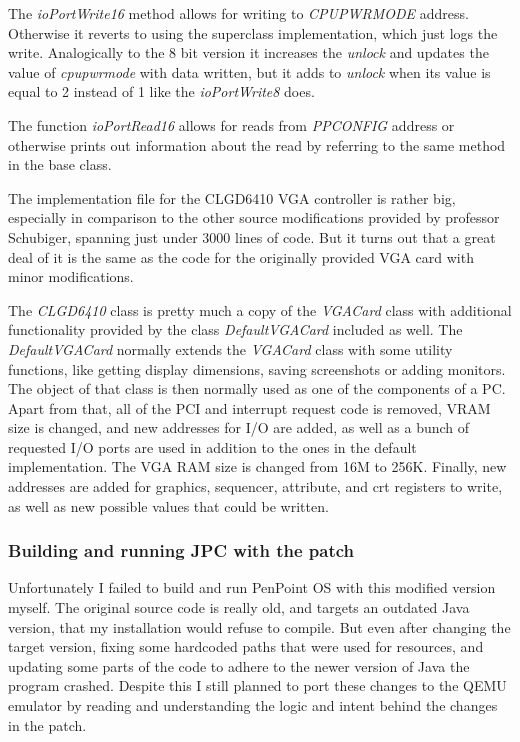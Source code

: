 The \emph{ioPortWrite16} method allows for writing to \emph{CPUPWRMODE}
address. Otherwise it reverts to using the superclass implementation, which just
logs the write. Analogically to the 8 bit version it increases the \emph{unlock}
and updates the value of \emph{cpupwrmode} with data written, but it adds to
\emph{unlock} when its value is equal to 2 instead of 1 like the
\emph{ioPortWrite8} does.

The function \emph{ioPortRead16} allows for reads from \emph{PPCONFIG} address
or otherwise prints out information about the read by referring to the same
method in the base class.

\begin{codeblock}
    
\end{codeblock}


The implementation file for the CLGD6410 VGA controller is rather big,
especially in comparison to the other source modifications provided by
professor Schubiger, spanning just under 3000 lines of code. But it turns out
that a great deal of it is the same as the code for the originally provided VGA
card with minor modifications.

The \emph{CLGD6410} class is pretty much a copy of the \emph{VGACard} class
with additional functionality provided by the class \emph{DefaultVGACard}
included as well. The \emph{DefaultVGACard} normally extends the \emph{VGACard}
class with some utility functions, like getting display dimensions, saving
screenshots or adding monitors. The object of that class is then normally used
as one of the components of a PC. Apart from that, all of the PCI and interrupt
request code is removed, VRAM size is changed, and new addresses for I/O are
added, as well as a bunch of requested I/O ports are used in addition to the
ones in the default implementation. The VGA RAM size is changed from 16M to
256K. Finally, new addresses are added for graphics, sequencer, attribute,
and crt registers to write, as well as new possible values that could be
written.

\subsubsection{Building and running JPC with the patch}

Unfortunately I failed to build and run PenPoint OS with this modified version
myself. The original source code is really old, and targets an outdated Java
version, that my installation would refuse to compile. But even after changing
the target version, fixing some hardcoded paths that were used for resources,
and updating some parts of the code to adhere to the newer version of Java the
program crashed. Despite this I still planned to port these changes to the QEMU
emulator by reading and understanding the logic and intent behind the changes
in the patch.

